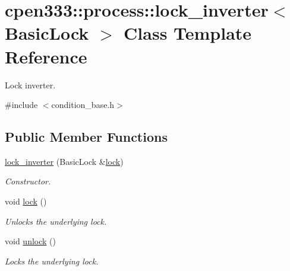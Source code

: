 \hypertarget{classcpen333_1_1process_1_1lock__inverter}{}\section{cpen333\+:\+:process\+:\+:lock\+\_\+inverter$<$ Basic\+Lock $>$ Class Template Reference}
\label{classcpen333_1_1process_1_1lock__inverter}


Lock inverter.  




{\ttfamily \#include $<$condition\+\_\+base.\+h$>$}

\subsection*{Public Member Functions}
\begin{DoxyCompactItemize}
\item 
\hyperlink{classcpen333_1_1process_1_1lock__inverter_a5d794669d828d4c4dcc6a06dbc10f3f0}{lock\+\_\+inverter} (Basic\+Lock \&\hyperlink{classcpen333_1_1process_1_1lock__inverter_a7281b963f45b2c3b511981c18123a66b}{lock})
\begin{DoxyCompactList}\small\item\em Constructor. \end{DoxyCompactList}\item 
\mbox{\label{classcpen333_1_1process_1_1lock__inverter_a7281b963f45b2c3b511981c18123a66b}} 
void \hyperlink{classcpen333_1_1process_1_1lock__inverter_a7281b963f45b2c3b511981c18123a66b}{lock} ()
\begin{DoxyCompactList}\small\item\em Unlocks the underlying lock. \end{DoxyCompactList}\item 
\mbox{\label{classcpen333_1_1process_1_1lock__inverter_ad8fb72f68de7a1082d1169e02937d9c9}} 
void \hyperlink{classcpen333_1_1process_1_1lock__inverter_ad8fb72f68de7a1082d1169e02937d9c9}{unlock} ()
\begin{DoxyCompactList}\small\item\em Locks the underlying lock. \end{DoxyCompactList}\end{DoxyCompactItemize}


